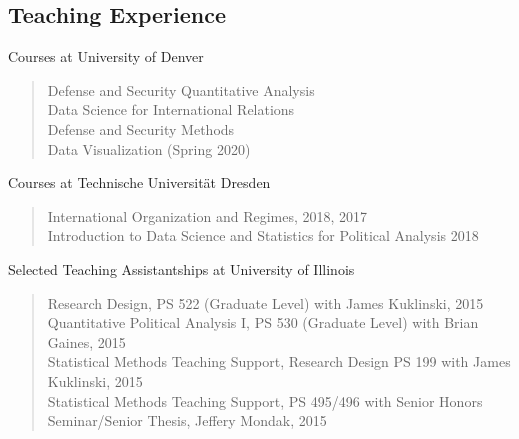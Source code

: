 \documentclass[margin, 10pt]{CVStyleTemplate}\usepackage[]{graphicx}\usepackage[dvipsnames]{xcolor}
\begin{document}
\begin{resume}
\section{Teaching Experience}

Courses at University of Denver
\begin{quotation} \noindent
Defense and Security Quantitative Analysis \\[6pt]
Data Science for International Relations  \\[6pt]
Defense and Security Methods \\[6pt]
Data Visualization (Spring 2020)
\end{quotation}

Courses at Technische Universit\"{a}t Dresden
\begin{quotation} \noindent
International Organization and Regimes, 2018, 2017 \\[6pt] %
Introduction to Data Science and Statistics for Political Analysis 2018
\end{quotation}

Selected Teaching Assistantships at University of Illinois
\begin{quotation} \noindent
Research Design, PS 522 (Graduate Level) with James Kuklinski, 2015 \\[6pt] %
Quantitative Political Analysis I, PS 530 (Graduate Level) with Brian Gaines, 2015 \\[6pt] %
Statistical Methods Teaching Support, Research Design PS 199 with James Kuklinski, 2015\\[6pt] %
Statistical Methods Teaching Support, PS 495/496  with Senior Honors Seminar/Senior Thesis, Jeffery Mondak, 2015\\[6pt] %
\end{quotation}
%


\end{resume}
\end{document}

